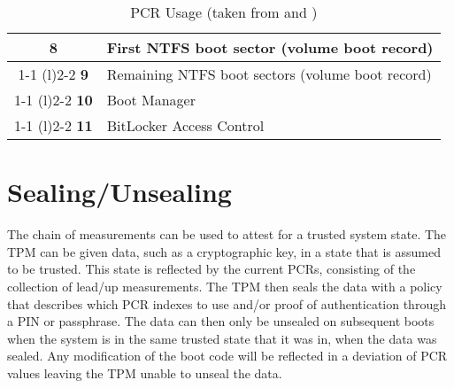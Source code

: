 \begin{table}[htb]
\begin{tabular}{cp{30em}}
        \multirow{2}{*}{\textbf{8}}                     & First \ac{NTFS} boot sector (volume boot record)                                                         \\
        \cmidrule[0.4pt](r){1-1}
        \cmidrule[0.4pt](l){2-2}
        \textbf{9}                                      & Remaining \ac{NTFS} boot sectors (volume boot record)                                                    \\
        \cmidrule[0.4pt](r){1-1}
        \cmidrule[0.4pt](l){2-2}
        \textbf{10}                                     & Boot Manager                                                                                             \\
        \cmidrule[0.4pt](r){1-1}
        \cmidrule[0.4pt](l){2-2}
        \textbf{11}                                     & BitLocker Access Control                                                                                 \\
        \bottomrule
    \end{tabular}%
    \caption{\ac{PCR} Usage (taken from \cite[Table 1]{tcg-pc-client-platform-firmware-profile-spec} and \cite[Table 9-2]{windows-internals-6-part2})}%
    \label{tab:pcr-usage}%
\end{table}


\section{Sealing/Unsealing}

The chain of measurements can be used to attest for a trusted system state.
The \ac{TPM} can be given data, such as a cryptographic key, in a state that is assumed to be trusted.
This state is reflected by the current \acp{PCR}, consisting of the collection of lead\-/up measurements.
The \ac{TPM} then seals the data with a policy that describes which \ac{PCR} indexes to use and/or proof of authentication through a \ac{PIN} or passphrase.
The data can then only be unsealed on subsequent boots when the system is in the same trusted state that it was in, when the data was sealed.
Any modification of the boot code will be reflected in a deviation of \ac{PCR} values leaving the \ac{TPM} unable to unseal the data.
